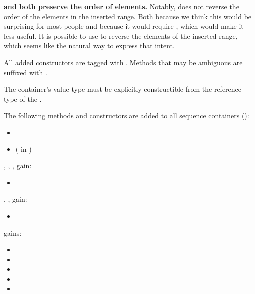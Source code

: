 \documentclass{wg21}
\begin{document}
\textbf{ and  both preserve the order of elements.}
Notably,  does not reverse the order of the elements in the inserted range.
Both because we think this would be surprising for most people and because it would require ,
which would make it less useful. It is possible to use  to reverse the elements of the inserted range,
which seems like the natural way to express that intent.


All added constructors are tagged with . Methods that may be ambiguous are suffixed with .

The container's value type must be explicitly constructible from the reference type of the  .

The following methods and constructors are added to all sequence containers ():

\begin{itemize}
    \item {}
    \item {} ( in )
\end{itemize}

, , ,  gain:
\begin{itemize}
    \item {}
\end{itemize}

, ,  gain:
\begin{itemize}
    \item {}
\end{itemize}


 gains:

\begin{itemize}
\item {}
\item {}
\item {}
\item {}
\item {}
\end{itemize}
\end{document}
